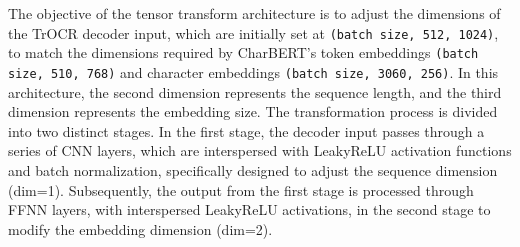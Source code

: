 
The objective of the tensor transform architecture is to adjust the dimensions of the TrOCR decoder input, which are initially set at \texttt{(batch size, 512, 1024)}, to match the dimensions required by CharBERT's token embeddings \texttt{(batch size, 510, 768)} and character embeddings \texttt{(batch size, 3060, 256)}. In this architecture, the second dimension represents the sequence length, and the third dimension represents the embedding size. The transformation process is divided into two distinct stages. In the first stage, the decoder input passes through a series of CNN layers, which are interspersed with LeakyReLU activation functions and batch normalization, specifically designed to adjust the sequence dimension (dim=1). Subsequently, the output from the first stage is processed through FFNN layers, with interspersed LeakyReLU activations, in the second stage to modify the embedding dimension (dim=2).

